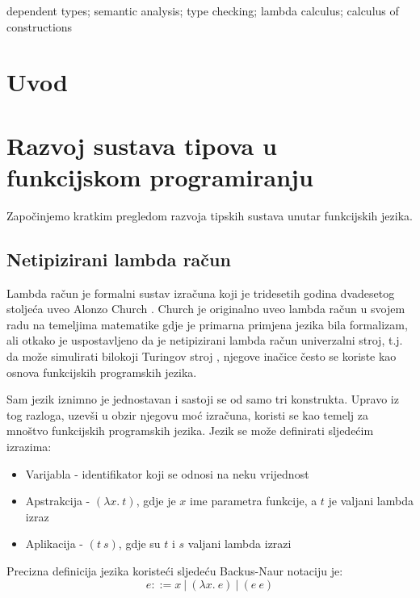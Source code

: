 \documentclass[diplomskirad,upload]{fer}
\begin{document}
\begin{keywords}
    dependent types; semantic analysis; type checking; lambda calculus; calculus of constructions
\end{keywords}


\tableofcontents

\chapter{Uvod}

\chapter{Razvoj sustava tipova u funkcijskom programiranju}

Započinjemo kratkim pregledom razvoja tipskih sustava unutar funkcijskih jezika.

\section{Netipizirani lambda račun}

Lambda račun  je formalni sustav izračuna koji je
tridesetih godina dvadesetog stoljeća uveo Alonzo Church
\cite{15897363-af72-3dac-82e6-fde144ad66c0}. Church je originalno uveo lambda
račun u svojem radu na temeljima matematike gdje je primarna primjena jezika
bila formalizam, ali otkako je uspostavljeno da je netipizirani lambda račun
univerzalni stroj, t.j. da može simulirati bilokoji Turingov stroj
\cite{Turing_1937}, njegove inačice često se koriste kao osnova funkcijskih programskih jezika.

Sam jezik iznimno je jednostavan i sastoji se od samo tri konstrukta. Upravo iz
tog razloga, uzevši u obzir njegovu moć izračuna, koristi se kao temelj za mnoštvo
funkcijskih programskih jezika. Jezik se može definirati sljedećim izrazima:

\begin{itemize}
    \item Varijabla - identifikator koji se odnosi na neku vrijednost
    \item Apstrakcija - \((\lambda x.\ t)\), gdje je \(x\) ime parametra funkcije, a
        \(t\) je valjani lambda izraz
    \item Aplikacija - \((t\ s)\), gdje su \(t\) i \(s\) valjani lambda izrazi
\end{itemize}

Precizna definicija jezika koristeći sljedeću Backus-Naur notaciju
 je:
\[
    e ::= x\ |\ (\lambda x.\ e)\ |\ (e\ e)
\]
\end{document}
